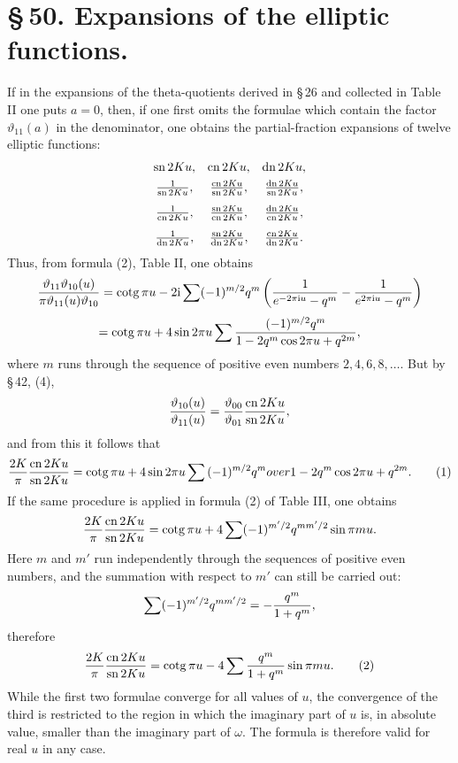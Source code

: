 \documentclass[11pt]{article}
\providecommand{\tht}{\vartheta}
\providecommand{\sn}{\operatorname{sn}}
\providecommand{\cn}{\operatorname{cn}}
\providecommand{\dn}{\operatorname{dn}}
\providecommand{\ctg}{\operatorname{cotg}}
\providecommand{\ii}{\mathrm{i}}
\begin{document}
\section*{\S\,50. Expansions of the elliptic functions.}

If in the expansions of the theta-quotients derived in \S\,26 and collected in Table II one puts $a=0$, then, if one first omits the formulae which contain the factor $\vartheta_{11}(a)$ in the denominator, one obtains the partial-fraction expansions of twelve elliptic functions:
\[
\begin{array}{ccc}
\sn 2Ku,& \cn 2Ku,& \dn 2Ku,\\[0.4em]
{1\over\sn 2Ku},& {\cn 2Ku\over\sn 2Ku},& {\dn 2Ku\over\sn 2Ku},\\[0.8em]
{1\over\cn 2Ku},& {\sn 2Ku\over\cn 2Ku},& {\dn 2Ku\over\cn 2Ku},\\[0.8em]
{1\over\dn 2Ku},& {\sn 2Ku\over\dn 2Ku},& {\cn 2Ku\over\dn 2Ku}.
\end{array}
\]
Thus, from formula (2), Table II, one obtains
\[
{\tht_{11}\tht_{10}(u)\over\pi\tht_{11}(u)\tht_{10}}
=\ctg\pi u-2\ii\sum (-1)^{m/2}q^m\left({1\over e^{-2\pi\ii u}-q^m}-{1\over e^{2\pi\ii u}-q^m}\right)
\]
\[
=\ctg\pi u+4\sin2\pi u\sum {(-1)^{m/2}q^m\over1-2q^m\cos2\pi u+q^{2m}},
\]
where $m$ runs through the sequence of positive even numbers $2,4,6,8,\dots$.
But by \S\,42, (4),
\[
{\tht_{10}(u)\over\tht_{11}(u)}={\tht_{00}\over\tht_{01}}{\cn2Ku\over\sn2Ku},
\]
and from this it follows that
\begin{equation}
{2K\over\pi}{\cn2Ku\over\sn2Ku}
=\ctg\pi u+4\sin2\pi u\sum{(-1)^{m/2}q^m
over1-2q^m\cos2\pi u+q^{2m}}.
\tag{1}
\end{equation}
If the same procedure is applied in formula (2) of Table III, one obtains
\[
{2K\over\pi}{\cn2Ku\over\sn2Ku}
=\ctg\pi u+4\sum(-1)^{m'/2}q^{mm'/2}\sin\pi m u.
\]
Here $m$ and $m'$ run independently through the sequences of positive even numbers, and the summation with respect to $m'$ can still be carried out:
\[
\sum(-1)^{m'/2}q^{mm'/2}=-{q^m\over1+q^m},
\]
therefore
\begin{equation}
{2K\over\pi}{\cn2Ku\over\sn2Ku}
=\ctg\pi u-4\sum {q^m\over1+q^m}\sin\pi m u.
\tag{2}
\end{equation}
While the first two formulae converge for all values of $u$, the convergence of the third is restricted to the region in which the imaginary part of $u$ is, in absolute value, smaller than the imaginary part of $\omega$. The formula is therefore valid for real $u$ in any case.
\end{document}
